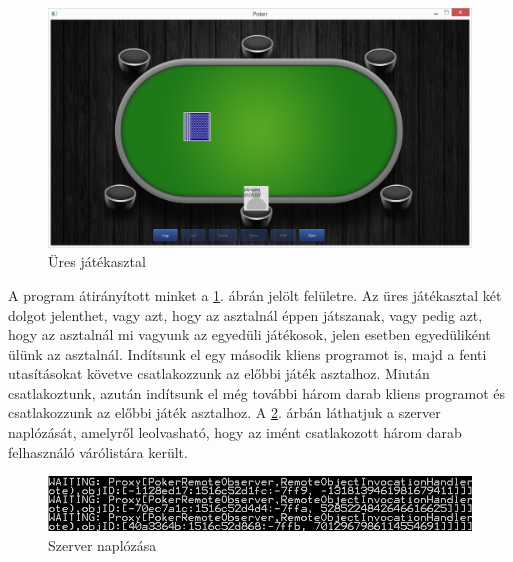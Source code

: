 \begin{figure}[h!]
  \caption{Üres játékasztal}
  \label{fig:parti_1}
  \centering
    \includegraphics[width=12cm]{user-documentation/images/parti/parti_1.jpg}
\end{figure}
A program átirányított minket a \ref{fig:parti_1}. ábrán jelölt felületre. Az üres játékasztal két dolgot jelenthet, vagy azt, hogy az asztalnál éppen játszanak, vagy pedig azt, hogy az asztalnál mi vagyunk az egyedüli játékosok, jelen esetben egyedüliként ülünk az asztalnál. Indítsunk el egy második kliens programot is, majd a fenti utasításokat követve csatlakozzunk az előbbi játék asztalhoz. Miután csatlakoztunk, azután indítsunk el még további három darab kliens programot és csatlakozzunk az előbbi játék asztalhoz. A \ref{fig:sv_log}. árbán láthatjuk a szerver naplózását, amelyről leolvasható, hogy az imént csatlakozott három darab felhasználó várólistára került. \\
\begin{figure}[h!]
  \caption{Szerver naplózása}
  \label{fig:sv_log}
  \centering
    \includegraphics[width=\textwidth]{user-documentation/images/sv_log.jpg}
\end{figure}

